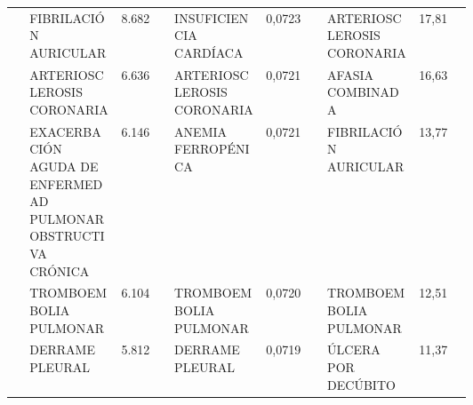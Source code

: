 \begin{landscape}
\begin{longtable}[c]{@{}lp{0.2\linewidth}lp{0.2\linewidth}lp{0.2\linewidth}l@{}}
                                  & FIBRILACIÓN AURICULAR                                         & 8.682  & INSUFICIENCIA CARDÍACA                                 & 0,0723 & ARTERIOSCLEROSIS CORONARIA                                    & 17,81    \\
                                  & ARTERIOSCLEROSIS CORONARIA                                    & 6.636  & ARTERIOSCLEROSIS CORONARIA                             & 0,0721 & AFASIA COMBINADA                                              & 16,63    \\
                                  & EXACERBACIÓN AGUDA DE ENFERMEDAD PULMONAR OBSTRUCTIVA CRÓNICA & 6.146  & ANEMIA FERROPÉNICA                                     & 0,0721 & FIBRILACIÓN AURICULAR                                         & 13,77    \\
                                  & TROMBOEMBOLIA PULMONAR                                        & 6.104  & TROMBOEMBOLIA PULMONAR                                 & 0,0720 & TROMBOEMBOLIA PULMONAR                                        & 12,51    \\
                                  & DERRAME PLEURAL                                               & 5.812  & DERRAME PLEURAL                                        & 0,0719 & ÚLCERA POR DECÚBITO                                           & 11,37    \\* \cmidrule(l){2-7} 
\end{longtable}
\end{landscape}

